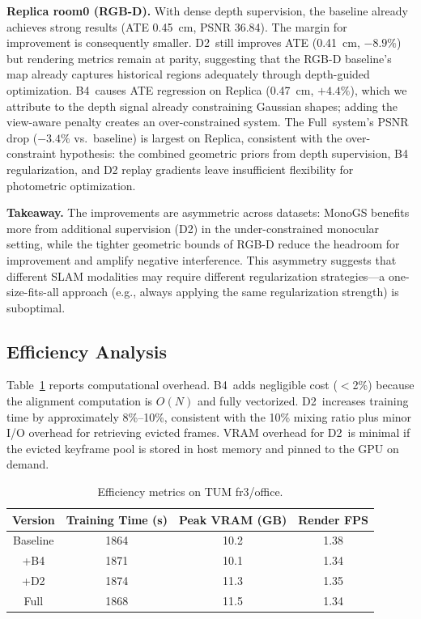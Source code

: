 \documentclass[conference]{IEEEtran}
\begin{document}
\textbf{Replica room0 (RGB-D).}
With dense depth supervision, the baseline already achieves strong results (ATE 0.45~cm, PSNR 36.84).
The margin for improvement is consequently smaller.
{D2}~still improves ATE (0.41~cm, $-8.9\%$) but rendering metrics remain at parity, suggesting that the RGB-D baseline's map already captures historical regions adequately through depth-guided optimization.
{B4}~causes ATE regression on Replica (0.47~cm, $+4.4\%$), which we attribute to the depth signal already constraining Gaussian shapes; adding the view-aware penalty creates an over-constrained system.
The Full~system's PSNR drop ($-3.4\%$ vs.~baseline) is largest on Replica, consistent with the over-constraint hypothesis: the combined geometric priors from depth supervision, B4 regularization, and D2 replay gradients leave insufficient flexibility for photometric optimization.

\textbf{Takeaway.}
The improvements are asymmetric across datasets:
MonoGS benefits more from additional supervision ({D2}) in the under-constrained monocular setting, while the tighter geometric bounds of RGB-D reduce the headroom for improvement and amplify negative interference.
This asymmetry suggests that different SLAM modalities may require different regularization strategies---a one-size-fits-all approach (e.g., always applying the same regularization strength) is suboptimal.

\subsection{Efficiency Analysis}
\label{sec:efficiency}

Table~\ref{tab:efficiency} reports computational overhead.
{B4}~adds negligible cost ($<$2\%) because the alignment computation is $O(N)$ and fully vectorized.
{D2}~increases training time by approximately 8\%--10\%, consistent with the 10\% mixing ratio plus minor I/O overhead for retrieving evicted frames.
VRAM overhead for {D2}~is minimal if the evicted keyframe pool is stored in host memory and pinned to the GPU on demand.

\begin{table}[htbp]
\caption{Efficiency metrics on TUM fr3/office.}
\label{tab:efficiency}
\begin{center}
\small
\setlength{\tabcolsep}{3pt}
\begin{tabular}{|c|c|c|c|}
\hline
\textbf{Version} & \textbf{Training Time (s)} & \textbf{Peak VRAM (GB)} & \textbf{Render FPS} \\
\hline
Baseline & 1864 & 10.2 & 1.38 \\
\hline
+{B4} & 1871 & 10.1 & 1.34 \\
\hline
+{D2} & 1874 & 11.3 & 1.35 \\
\hline
Full & 1868 & 11.5 & 1.34 \\
\hline
\end{tabular}
\end{center}
\end{table}
\end{document}
